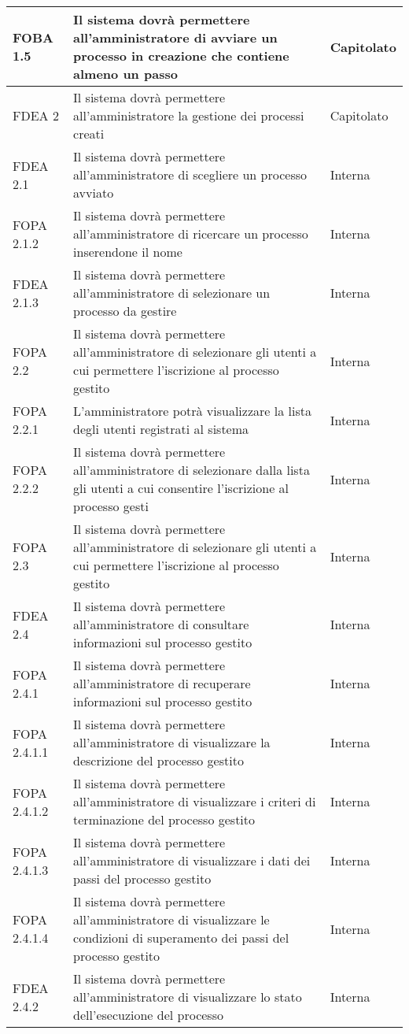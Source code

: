 \begin{longtable}{lXp{}}
\midrule
FOBA 1.5&Il sistema dovrà permettere all'amministratore di avviare un processo in creazione che contiene almeno un passo&Capitolato\\
\midrule
FDEA 2&Il sistema dovrà permettere all'amministratore la gestione dei processi creati&Capitolato\\
\midrule
FDEA 2.1&Il sistema dovrà permettere all'amministratore di scegliere un processo avviato&Interna\\
\midrule
FOPA 2.1.2&Il sistema dovrà permettere all'amministratore di ricercare un processo inserendone il nome&Interna\\
\midrule
FDEA 2.1.3&Il sistema dovrà permettere all'amministratore di selezionare un processo da gestire&Interna\\
\midrule
FOPA 2.2&Il sistema dovrà permettere all'amministratore di selezionare gli utenti a cui permettere l'iscrizione al processo gestito&Interna\\
\midrule
FOPA 2.2.1&L'amministratore potrà visualizzare la lista degli utenti registrati al sistema&Interna\\
\midrule
FOPA 2.2.2&Il sistema dovrà permettere all'amministratore di selezionare dalla lista gli utenti a cui consentire l'iscrizione al processo gesti&Interna\\
\midrule
FOPA 2.3&Il sistema dovrà permettere all'amministratore di selezionare gli utenti a cui permettere l'iscrizione al processo gestito&Interna\\
\midrule
FDEA 2.4&Il sistema dovrà permettere all'amministratore di consultare informazioni sul processo gestito&Interna\\
\midrule
FOPA 2.4.1&Il sistema dovrà permettere all'amministratore di recuperare informazioni sul processo gestito&Interna\\
\midrule
FOPA 2.4.1.1&Il sistema dovrà permettere all'amministratore di visualizzare la descrizione del processo gestito&Interna\\
\midrule
FOPA 2.4.1.2&Il sistema dovrà permettere all'amministratore di visualizzare i criteri di terminazione del processo gestito&Interna\\
\midrule
FOPA 2.4.1.3&Il sistema dovrà permettere all'amministratore di visualizzare i dati dei passi del processo gestito&Interna\\
\midrule
FOPA 2.4.1.4&Il sistema dovrà permettere all'amministratore di visualizzare le condizioni di superamento dei passi del processo gestito&Interna\\
\midrule
FDEA 2.4.2&Il sistema dovrà permettere all'amministratore di visualizzare lo stato dell'esecuzione del processo&Interna\\

\end{longtable}
